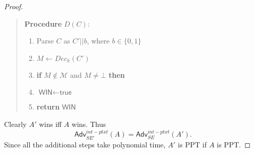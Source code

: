 \documentclass[12pt]{article}
\newcommand{\bits}{\{0,1\}}
\newcommand{\Adv}{\textsf{Adv}}
\newcommand{\tab}{\hspace{0.3in}}
\newcommand{\WIN}{\textsf{WIN}}
\newcommand{\true}{\textsf{true}}
\newcommand{\M}{\mathcal{M}}
\theoremstyle{definition}
\begin{document}
\begin{proof}
\begin{quote}
\begin{minipage}[t]{0.5\textwidth}
{\bf Procedure} $D(C)$:
\begin{enumerate}
\item Parse $C$ as $C'||b$, where $b \in \bits$
\item $M \gets Dec_k(C')$
\item {\bf if} $M \not\in \M$ and $M \not=\bot$ {\bf then}
\item \tab $\WIN \gets \true$
\item {\bf return} $\WIN$
\end{enumerate}
\end{minipage}
\end{quote}
Clearly $A'$ wins iff $A$ wins. Thus
$$\Adv_{SE'}^{int-ptxt}(A) = \Adv_{SE}^{int-ptxt}(A').$$
Since all the additional steps take polynomial time, $A'$ is PPT if $A$ is PPT.
\end{proof}
\end{document}
